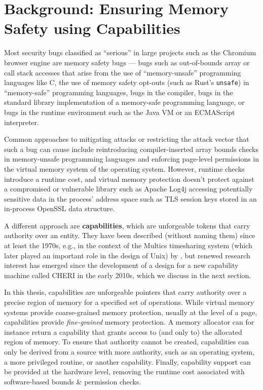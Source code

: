 \documentclass[main.tex]{subfiles}
\begin{document}
\onlyinsubfile{\mainmatter{}}

\chapter{Background: Ensuring Memory Safety using Capabilities} \label{ch:cheri}
Most security bugs classified as \enquote{serious} in large projects such as the Chromium browser engine are memory safety bugs \citep{chromium} — bugs such as out-of-bounds array or call stack accesses that arise from the use of \enquote{memory-unsafe} programming languages like C, the use of memory safety opt-outs (such as Rust’s \texttt{unsafe}) in \enquote{memory-safe} programming languages, bugs in the compiler, bugs in the standard library implementation of a memory-safe programming language, or bugs in the runtime environment such as the Java VM or an ECMAScript interpreter.

Common approaches to mitigating attacks or restricting the attack vector that such a bug can cause include reintroducing compiler-inserted array bounds checks in memory-unsafe programming languages and enforcing page-level permissions in the virtual memory system of the operating system. However, runtime checks introduce a runtime cost, and virtual memory protection doesn’t protect against a compromised or vulnerable library such as Apache Log4j accessing potentially sensitive data in the process’ address space such as TLS session keys stored in an in-process OpenSSL data structure.

A different approach are \textbf{capabilities}, which are unforgeable tokens that carry authority over an entity.\citep[Section~1.1]{capsys} They have been described (without naming them) since at least the 1970s, e.g., in the context of the Multics timesharing system (which later played an important role in the design of Unix) by \citet{multics}, but renewed research interest has emerged since the development of a design for a new capability machine called CHERI in the early 2010s,\citep[Section~A.1, Chapter~13]{cheri} which we discuss in the next section.

In this thesis, capabilities are unforgeable pointers that carry authority over a precise region of memory for a specified set of operations. While virtual memory systems provide coarse-grained memory protection, usually at the level of a page, capabilities provide \emph{fine-grained} memory protection. A memory allocator can for instance return a capability that grants access to (and only to) the allocated region of memory. To ensure that authority cannot be created, capabilities can only be derived from a source with more authority, such as an operating system, a more privileged routine, or another capability. Finally, capability support can be provided at the hardware level, removing the runtime cost associated with software-based bounds \& permission checks.
\end{document}
